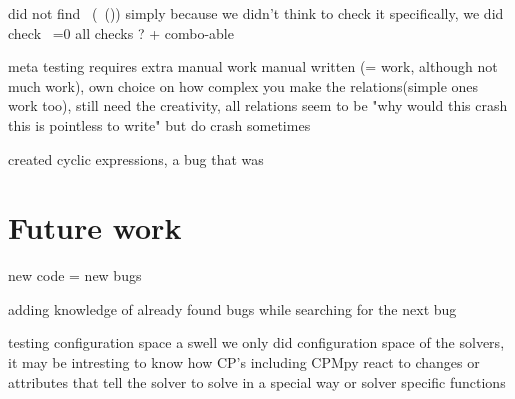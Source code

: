 did not find ~(~()) simply because we didn't think to check it specifically, we did check ~=0
all checks ? + combo-able

meta testing requires extra manual work
manual written (= work, although not much work), own choice on how complex you make the relations(simple ones work too), still need the creativity, all relations seem to be "why would this crash this is pointless to write" but do crash sometimes

created cyclic expressions, a bug that was  

\section{Future work}
\label{con:FutureWork}

new code = new bugs

adding knowledge of already found bugs while searching for the next bug


testing configuration space a swell \cite{42FalconFuzzingConfigurationSettingsAndNormal}
we only did configuration space of the solvers, it may be intresting to know how CP's including CPMpy react to changes or attributes that tell the solver to solve in a special way 
or solver specific functions 





